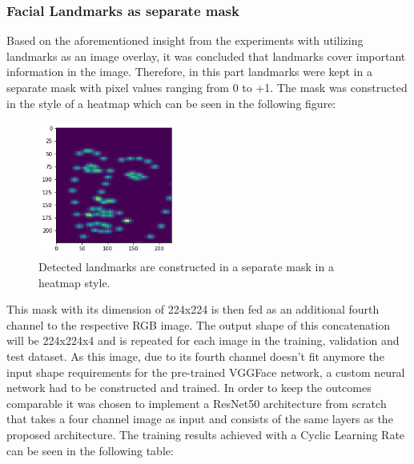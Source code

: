 \subsubsection{Facial Landmarks as separate mask}
Based on the aforementioned insight from the experiments with utilizing landmarks as an image overlay, it was concluded that landmarks cover important information in the image. Therefore, in this part landmarks were kept in a separate mask with pixel values ranging from 0 to +1. The mask was constructed in the style of a heatmap which can be seen in the following figure:

\begin{figure}[H]
  \begin{center}
  \includegraphics[angle=0, width=0.4\textwidth]{Figures/landmarks_as_heatmap_in_mask.png}
  \caption{Detected landmarks are constructed in a separate mask in a heatmap style.}
  \label{fig:LandmarksMask}
  \end{center}
\end{figure}

This mask with its dimension of 224x224 is then fed as an additional fourth channel to the respective RGB image. The output shape of this concatenation will be 224x224x4 and is repeated for each image in the training, validation and test dataset.
\newline\newline
As this image, due to its fourth channel doesn't fit anymore the input shape requirements for the pre-trained VGGFace network, a custom neural network had to be constructed and trained. In order to keep the outcomes comparable it was chosen to implement a ResNet50 architecture from scratch that takes a four channel image as input and consists of the same layers as the proposed architecture. The training results achieved with a Cyclic Learning Rate can be seen in the following table:

